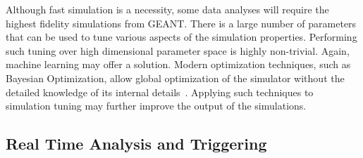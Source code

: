 Although fast simulation is a necessity, some data analyses will require the highest fidelity simulations from GEANT. There is a large number of parameters that can be used to tune various aspects of the simulation properties. Performing such tuning over high dimensional parameter space is highly non-trivial.  Again, machine learning may offer a solution.  Modern optimization techniques, such as Bayesian Optimization, allow global optimization of the simulator without the detailed knowledge of its internal details~\cite{Ilten:2016csi}. Applying such techniques to simulation tuning may further improve the output of the simulations.



\subsection{Real Time Analysis and Triggering}
\label{sec:real-time-analysis}

